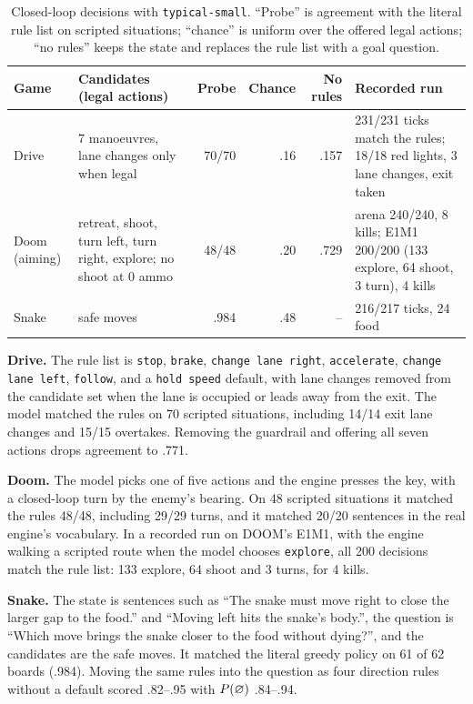 \begin{table}[h]
  \centering
  \caption{Closed-loop decisions with \texttt{typical-small}. ``Probe'' is agreement with the literal
  rule list on scripted situations; ``chance'' is uniform over the offered legal actions; ``no rules''
  keeps the state and replaces the rule list with a goal question.}
  \label{tab:app-closed-loop}
  \small
  \setlength{\tabcolsep}{3pt}
  \begin{tabular}{lp{3.1cm}rrrp{3.6cm}}
    \toprule
    Game & Candidates (legal actions) & Probe & Chance & No rules & Recorded run \\
    \midrule
    Drive & 7 manoeuvres, lane changes only when legal & 70/70 & .16 & .157 & 231/231 ticks match the rules; 18/18 red lights, 3 lane changes, exit taken \\
    Doom (aiming) & retreat, shoot, turn left, turn right, explore; no shoot at 0 ammo & 48/48 & .20 & .729 & arena 240/240, 8 kills; E1M1 200/200 (133 explore, 64 shoot, 3 turn), 4 kills \\
    Snake & safe moves & .984 & .48 & -- & 216/217 ticks, 24 food \\
    \bottomrule
  \end{tabular}
\end{table}

\textbf{Drive.} The rule list is \texttt{stop}, \texttt{brake}, \texttt{change lane right},
\texttt{accelerate}, \texttt{change lane left}, \texttt{follow}, and a \texttt{hold speed} default, with
lane changes removed from the candidate set when the lane is occupied or leads away from the exit. The
model matched the rules on 70 scripted situations, including 14/14 exit lane changes and 15/15
overtakes. Removing the guardrail and offering all seven actions drops agreement to .771.

\textbf{Doom.} The model picks one of five actions and the engine presses the key, with a closed-loop
turn by the enemy's bearing. On 48 scripted situations it matched the rules 48/48, including 29/29
turns, and it matched 20/20 sentences in the real engine's vocabulary. In a recorded run on DOOM's
E1M1, with the engine walking a scripted route when the model chooses \texttt{explore}, all 200
decisions match the rule list: 133 explore, 64 shoot and 3 turns, for 4 kills.

\textbf{Snake.} The state is sentences such as ``The snake must move right to close the larger gap to
the food.'' and ``Moving left hits the snake's body.'', the question is ``Which move brings the snake
closer to the food without dying?'', and the candidates are the safe moves. It matched the literal
greedy policy on 61 of 62 boards (.984). Moving the same rules into the question as four direction
rules without a default scored .82--.95 with $P(\varnothing)$ .84--.94.

